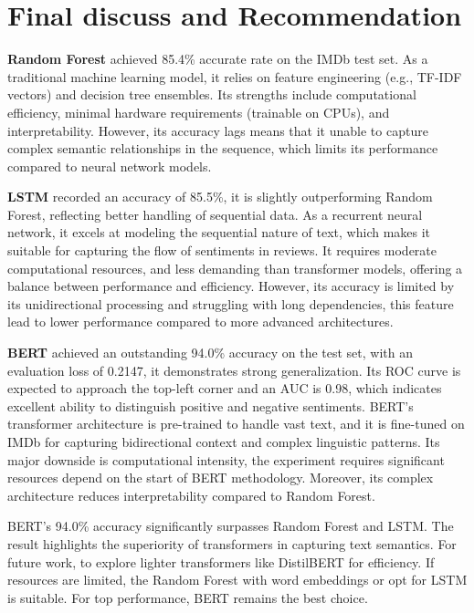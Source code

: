 \section{Final discuss and Recommendation}

\textbf{Random Forest} achieved 85.4\% accurate rate on the IMDb test set. As a traditional machine learning model, it relies on feature engineering (e.g., TF-IDF vectors) and decision tree ensembles. Its strengths include computational efficiency, minimal hardware requirements (trainable on CPUs), and interpretability. However, its accuracy lags means that it unable to capture complex semantic relationships in the sequence, which limits its performance compared to neural network models.

\textbf{LSTM} recorded an accuracy of 85.5\%, it is slightly outperforming Random Forest, reflecting better handling of sequential data. As a recurrent neural network, it excels at modeling the sequential nature of text, which makes it suitable for capturing the flow of sentiments in reviews. It requires moderate computational resources, and less demanding than transformer models, offering a balance between performance and efficiency. However, its accuracy is limited by its unidirectional processing and struggling with long dependencies, this feature lead to lower performance compared to more advanced architectures.

\textbf{BERT} achieved an outstanding 94.0\% accuracy on the test set, with an evaluation loss of 0.2147, it demonstrates strong generalization. Its ROC curve is expected to approach the top-left corner and an AUC is 0.98, which indicates excellent ability to distinguish positive and negative sentiments. BERT's transformer architecture is pre-trained to handle vast text, and it is fine-tuned on IMDb for capturing bidirectional context and complex linguistic patterns. Its major downside is computational intensity, the experiment requires significant resources depend on the start of BERT methodology. Moreover, its complex architecture reduces interpretability compared to Random Forest.

BERT's 94.0\% accuracy significantly surpasses Random Forest and LSTM. The result highlights the superiority of transformers in capturing text semantics. For future work, to explore lighter transformers like DistilBERT for efficiency. If resources are limited, the Random Forest with word embeddings or opt for LSTM is suitable. For top performance, BERT remains the best choice.